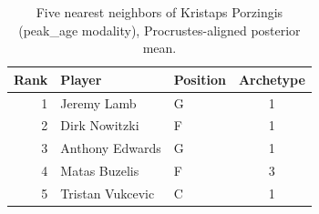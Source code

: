 \begin{table}[htbp]
  \centering\small
  \begin{tabular}{rllc}
    \toprule
    Rank & Player & Position & Archetype \\
    \midrule
    1 & Jeremy Lamb & G & 1 \\
    2 & Dirk Nowitzki & F & 1 \\
    3 & Anthony Edwards & G & 1 \\
    4 & Matas Buzelis & F & 3 \\
    5 & Tristan Vukcevic & C & 1 \\
    \bottomrule
  \end{tabular}
  \caption{Five nearest neighbors of Kristaps Porzingis (peak_age modality), Procrustes-aligned posterior mean.}
  \label{tab:Kristaps_Porzingis_neighbors_peak_age}
\end{table}

